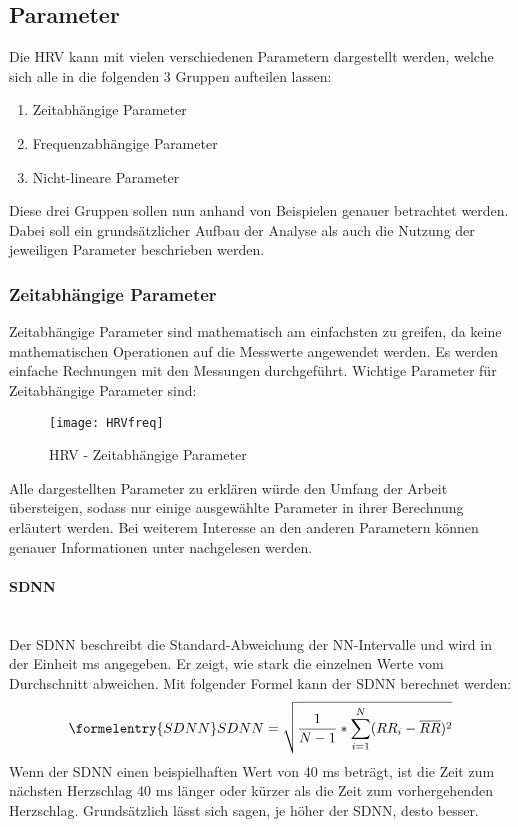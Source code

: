 \subsection{Parameter}

Die \acs{HRV} kann mit vielen verschiedenen Parametern dargestellt werden, welche sich alle in die folgenden 3 Gruppen aufteilen lassen:

\begin{enumerate}
	\item Zeitabhängige Parameter
	\item Frequenzabhängige Parameter
	\item Nicht-lineare Parameter
\end{enumerate}

Diese drei Gruppen sollen nun anhand von Beispielen genauer betrachtet werden. Dabei soll ein grundsätzlicher Aufbau der Analyse als auch die Nutzung der jeweiligen Parameter beschrieben werden.

\subsubsection{Zeitabhängige Parameter}	
Zeitabhängige Parameter sind mathematisch am einfachsten zu greifen, da keine mathematischen Operationen auf die Messwerte angewendet werden. Es werden einfache Rechnungen mit den Messungen durchgeführt. Wichtige Parameter für Zeitabhängige Parameter sind:   
 
\begin{figure}[H]
	\centering
	\texttt{[image: HRVfreq]}
	\caption{HRV - Zeitabhängige Parameter}
	\label{fig:HRVfreq}
	\cite[S.2]{med}
\end{figure}
Alle dargestellten Parameter zu erklären würde den Umfang der Arbeit übersteigen, sodass nur einige ausgewählte Parameter in ihrer Berechnung erläutert werden. Bei weiterem Interesse an den anderen Parametern können genauer Informationen unter \cite{med} nachgelesen werden. 

\paragraph{\ac{SDNN}}\mbox{} \\
Der \acs{SDNN} beschreibt die Standard-Abweichung der NN-Intervalle und wird in der Einheit ms angegeben. Er zeigt, wie stark die einzelnen Werte vom Durchschnitt abweichen. Mit folgender Formel kann der \acs{SDNN} berechnet werden: 
\begin{equation}\formelentry{SDNN}
SDNN = \sqrt{\dfrac{1}{N-1} * \sum\limits_{i=1}^{N}  (RR_i - \overline{RR})^{2}}
\end{equation}
Wenn der \acs{SDNN} einen beispielhaften Wert von 40 ms beträgt, ist die Zeit zum nächsten Herzschlag 40 ms länger oder kürzer als die Zeit zum vorhergehenden Herzschlag. Grundsätzlich lässt sich sagen, je höher der \acs{SDNN}, desto besser.\\

